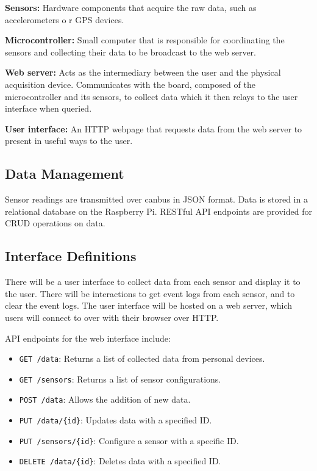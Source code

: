 \textbf{Sensors:} Hardware components that acquire the raw data, such as
accelerometers o r GPS devices.

\textbf{Microcontroller:} Small computer that is responsible for
coordinating the sensors and collecting their data to be broadcast to
the web server.

\textbf{Web server:} Acts as the intermediary between the user and the
physical acquisition device. Communicates with the board, composed of
the microcontroller and its sensors, to collect data which it then
relays to the user interface when queried.

\textbf{User interface:} An HTTP webpage that requests data from the web
server to present in useful ways to the user.

\hypertarget{data-management}{%
\subsection{Data Management}\label{data-management}}

Sensor readings are transmitted over canbus in JSON format. Data is
stored in a relational database on the Raspberry Pi. RESTful API
endpoints are provided for CRUD operations on data.

\hypertarget{interface-definitions}{%
\subsection{Interface Definitions}\label{interface-definitions}}

There will be a user interface to collect data from each sensor and
display it to the user. There will be interactions to get event logs
from each sensor, and to clear the event logs. The user interface will
be hosted on a web server, which users will connect to over with their
browser over HTTP.

API endpoints for the web interface include:

\begin{itemize}
\tightlist
\item
  \texttt{GET\ /data}: Returns a list of collected data from personal
  devices.\\
\item
  \texttt{GET\ /sensors}: Returns a list of sensor configurations.\\
\item
  \texttt{POST\ /data}: Allows the addition of new data.\\
\item
  \texttt{PUT\ /data/\{id\}}: Updates data with a specified ID.\\
\item
  \texttt{PUT\ /sensors/\{id\}}: Configure a sensor with a specific
  ID.\\
\item
  \texttt{DELETE\ /data/\{id\}}: Deletes data with a specified ID.
\end{itemize}

